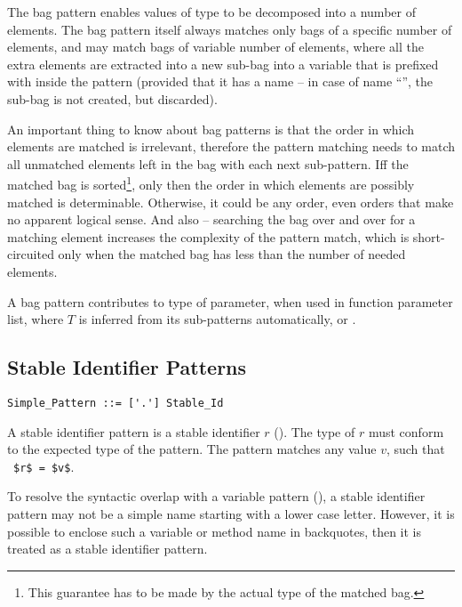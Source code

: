 The bag pattern enables values of  type to be decomposed into a number of elements. The bag pattern itself always matches only bags of a specific number of elements, and may match bags of variable number of elements, where all the extra elements are extracted into a new sub-bag into a variable that is prefixed with \code{*} inside the pattern (provided that it has a name -- in case of name ``\code{_}'', the sub-bag is not created, but discarded). 

An important thing to know about bag patterns is that the order in which elements are matched is irrelevant, therefore the pattern matching needs to match all unmatched elements left in the bag with each next sub-pattern. Iff the matched bag is sorted\footnote{This guarantee has to be made by the actual type of the matched bag.}, only then the order in which elements are possibly matched is determinable. Otherwise, it could be any order, even orders that make no apparent logical sense. And also -- searching the bag over and over for a matching element increases the complexity of the pattern match, which is short-circuited only when the matched bag has less than the number of needed elements. 

A bag pattern contributes  to type of parameter, when used in function parameter list, where $T$ is inferred from its sub-patterns automatically, or . 






\subsection{Stable Identifier Patterns}
\label{sec:stable-identifier-patterns}

\syntax\begin{lstlisting}
Simple_Pattern ::= ['.'] Stable_Id
\end{lstlisting}

A stable identifier pattern is a stable identifier $r$ (). The type of $r$ must conform to the expected type of the pattern. The pattern matches any value $v$, such that ~\lstinline!$r$ = $v$!.

To resolve the syntactic overlap with a variable pattern (), a stable identifier pattern may not be a simple name starting with a lower case letter. However, it is possible to enclose such a variable or method name in backquotes, then it is treated as a stable identifier pattern. 


